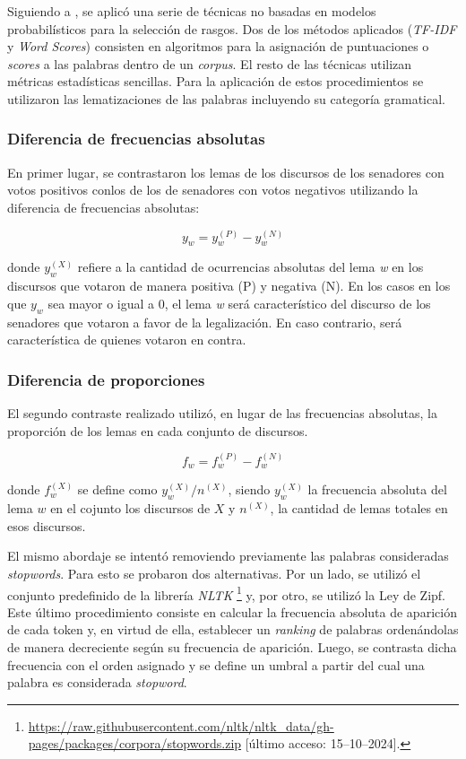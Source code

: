Siguiendo a \cite{monroe2008fightin}, se aplic\'o una serie de t\'ecnicas
no basadas en modelos probabil\'isticos para la selecci\'on de rasgos.
Dos de los m\'etodos aplicados (\textit{TF-IDF} y \textit{Word Scores}) consisten
en algoritmos para la asignaci\'on de puntuaciones o \textit{scores} a las
palabras dentro de un \textit{corpus}. El resto de las t\'ecnicas utilizan
m\'etricas estad\'isticas sencillas. Para la aplicaci\'on de estos procedimientos
se utilizaron las lematizaciones de las palabras incluyendo su categor\'ia
gramatical.

\subsubsection{Diferencia de frecuencias absolutas}
\label{subsubsec-methods-freq-abs}
En primer lugar, se contrastaron los lemas de los discursos de los
senadores con votos positivos conlos de los de senadores con votos negativos
utilizando la diferencia de frecuencias absolutas:

\begin{equation}
y_w = y_{w}^{(P)}-y_{w}^{(N)}
\end{equation}

donde $y_{w}^{(X)}$ refiere a la cantidad de ocurrencias absolutas del lema
\textit{w} en los discursos que votaron de manera positiva (P) y negativa (N).
En los casos en los que $y_{w}$ sea mayor o igual a $0$, el lema \textit{w}
ser\'a caracter\'istico del discurso de los senadores que votaron a favor de
la legalizaci\'on. En caso contrario, ser\'a caracter\'istica de quienes votaron
en contra.

\subsubsection{Diferencia de proporciones}
\label{subsubsec-methods-proportions}
El segundo contraste realizado utiliz\'o, en lugar de las frecuencias absolutas,
la proporci\'on de los lemas en cada conjunto de discursos.

\begin{equation}
    f_w = f_{w}^{(P)}-f_{w}^{(N)}
\end{equation}


donde $f_{w}^{(X)}$ se define como $y_{w}^{(X)} / n^{(X)}$, siendo $y_{w}^{(X)}$
la frecuencia absoluta del lema $w$ en el cojunto los discursos de $X$
y $n^{(X)}$, la cantidad de lemas totales en esos discursos.

El mismo abordaje se intent\'o removiendo previamente las palabras consideradas
\textit{stopwords}. Para esto se probaron dos alternativas. Por un lado, se
utiliz\'o el conjunto predefinido de la librer\'ia \textit{NLTK}
\footnote{\url{https://raw.githubusercontent.com/nltk/nltk_data/gh-pages/packages/corpora/stopwords.zip} [\'ultimo acceso: 15--10--2024].}
y, por otro, se utiliz\'o la Ley de Zipf. Este \'ultimo procedimiento consiste en
calcular la frecuencia absoluta de aparici\'on de
cada token y, en virtud de ella, establecer un \textit{ranking} de palabras
orden\'andolas de manera decreciente seg\'un su frecuencia de aparici\'on.
Luego, se contrasta dicha frecuencia con el orden asignado y se define
un umbral a partir del cual una palabra es considerada \textit{stopword}.

